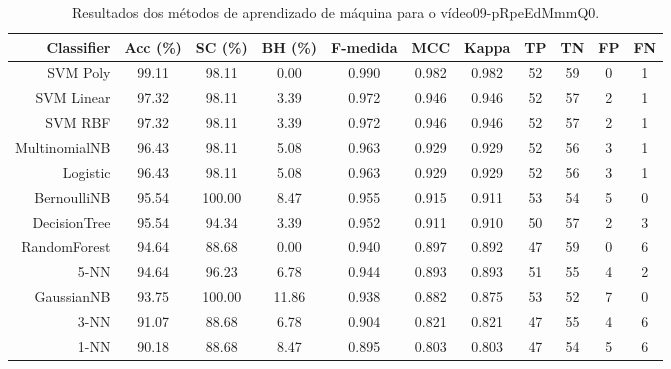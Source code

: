 \begin{table}[!htb]
\centering
\caption{Resultados dos métodos de aprendizado de máquina para o vídeo09-pRpeEdMmmQ0.}
\label{tab:09-pRpeEdMmmQ0}
\begin{tabular}{r|c|c|c|c|c|c|c|c|c|c}
\hline\hline
Classifier & Acc (\%) & SC (\%) & BH (\%) & F-medida & MCC & Kappa & TP & TN & FP & FN \\ \hline
SVM Poly & 99.11 & 98.11 & 0.00 & 0.990 & 0.982 & 0.982 & 52 & 59 & 0 & 1 \\ 
SVM Linear & 97.32 & 98.11 & 3.39 & 0.972 & 0.946 & 0.946 & 52 & 57 & 2 & 1 \\ 
SVM RBF & 97.32 & 98.11 & 3.39 & 0.972 & 0.946 & 0.946 & 52 & 57 & 2 & 1 \\ 
MultinomialNB & 96.43 & 98.11 & 5.08 & 0.963 & 0.929 & 0.929 & 52 & 56 & 3 & 1 \\ 
Logistic & 96.43 & 98.11 & 5.08 & 0.963 & 0.929 & 0.929 & 52 & 56 & 3 & 1 \\ 
BernoulliNB & 95.54 & 100.00 & 8.47 & 0.955 & 0.915 & 0.911 & 53 & 54 & 5 & 0 \\ 
DecisionTree & 95.54 & 94.34 & 3.39 & 0.952 & 0.911 & 0.910 & 50 & 57 & 2 & 3 \\ 
RandomForest & 94.64 & 88.68 & 0.00 & 0.940 & 0.897 & 0.892 & 47 & 59 & 0 & 6 \\ 
5-NN & 94.64 & 96.23 & 6.78 & 0.944 & 0.893 & 0.893 & 51 & 55 & 4 & 2 \\ 
GaussianNB & 93.75 & 100.00 & 11.86 & 0.938 & 0.882 & 0.875 & 53 & 52 & 7 & 0 \\ 
3-NN & 91.07 & 88.68 & 6.78 & 0.904 & 0.821 & 0.821 & 47 & 55 & 4 & 6 \\ 
1-NN & 90.18 & 88.68 & 8.47 & 0.895 & 0.803 & 0.803 & 47 & 54 & 5 & 6 \\ 
\hline\hline
\end{tabular}
\end{table}
